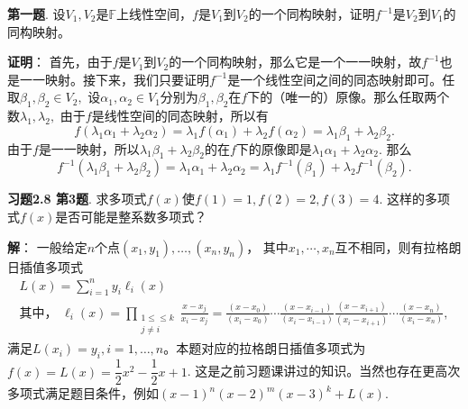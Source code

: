 
\renewcommand{\newpageorvspace}{\vspace{2em}}

\date{2022-10-待定  第三次习题课}
\author{}



\maketitle


{\bf 第一题}. 设$V_1, V_2$是$\mathbb{F}$上线性空间，$f$是$V_1$到$V_2$的一个同构映射，证明$f^{-1}$是$V_2$到$V_1$的同构映射。

\newpageorvspace

{\bf 证明}： 首先，由于$f$是$V_1$到$V_2$的一个同构映射，那么它是一个一一映射，故$f^{-1}$也是一一映射。接下来，我们只要证明$f^{-1}$是一个线性空间之间的同态映射即可。任取$\beta_1, \beta_2 \in V_2,$ 设$\alpha_1, \alpha_2 \in V_1$分别为$\beta_1, \beta_2$在$f$下的（唯一的）原像。那么任取两个数$\lambda_1, \lambda_2,$ 由于$f$是线性空间的同态映射，所以有
$$f(\lambda_1 \alpha_1 + \lambda_2 \alpha_2) = \lambda_1 f(\alpha_1) + \lambda_2 f(\alpha_2) = \lambda_1 \beta_1 + \lambda_2 \beta_2.$$
由于$f$是一一映射，所以$\lambda_1 \beta_1 + \lambda_2 \beta_2$的在$f$下的原像即是$\lambda_1 \alpha_1 + \lambda_2 \alpha_2.$ 那么
$$f^{-1}(\lambda_1 \beta_1 + \lambda_2 \beta_2) = \lambda_1 \alpha_1 + \lambda_2 \alpha_2 = \lambda_1 f^{-1}(\beta_1) + \lambda_2 f^{-1}(\beta_2).$$

\newpageorvspace

{\bf 习题2.8 第3题}. 求多项式$f(x)$使$f(1) = 1, f(2) = 2, f(3) = 4.$ 这样的多项式$f(x)$是否可能是整系数多项式？

\newpageorvspace

{\bf 解}： 一般给定$n$个点$(x_1,y_1), \dots, (x_n,y_n)$， 其中$x_1, \cdots, x_n$互不相同，则有拉格朗日插值多项式
\begin{gather*}
L(x) = \sum_{i=1}^{n}y_{i}\ell_{i}(x) \\
\text{其中， } \ell_{i}(x) = \prod_{\begin{smallmatrix}1\leq \leq k \\ j\neq i\end{smallmatrix}}{\frac {x-x_{j}}{x_{i}-x_{j}}}={\frac {(x-x_{0})}{(x_{i}-x_{0})}}\cdots {\frac {(x-x_{i-1})}{(x_{i}-x_{i-1})}}{\frac {(x-x_{i+1})}{(x_{i}-x_{i+1})}}\cdots {\frac {(x-x_{n})}{(x_{i}-x_{n})}},
\end{gather*}
满足$L(x_i) = y_i, i=1, \dots ,n$。本题对应的拉格朗日插值多项式为$f(x) = L(x) = \dfrac{1}{2}x^2 - \dfrac{1}{2}x + 1$. 这是之前习题课讲过的知识。当然也存在更高次多项式满足题目条件，例如$(x-1)^n(x-2)^m(x-3)^k + L(x)$.

